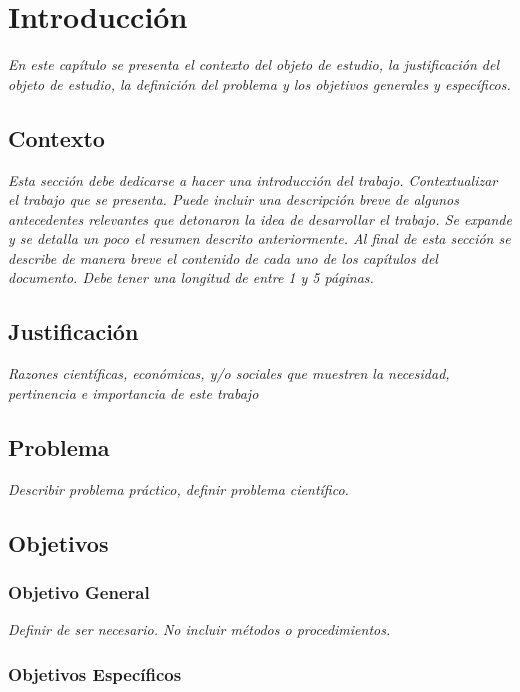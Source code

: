 \chapter{Introducción}
\label{ch:Intro}

\textit{En este capítulo se presenta el contexto del objeto de estudio, la justificación del objeto de estudio, la definición del problema y los objetivos generales y específicos.}

\newpage

\section{Contexto}

\textit{Esta sección debe dedicarse a hacer una introducción del trabajo. Contextualizar el trabajo que se presenta. Puede incluir una descripción breve de algunos antecedentes relevantes que detonaron la idea de desarrollar el trabajo. Se expande y se detalla un poco el resumen descrito anteriormente. Al final de esta sección se describe de manera breve el contenido de cada uno de los capítulos del documento. Debe tener una longitud de entre 1 y 5 páginas.}

\section{Justificación}

\textit{Razones científicas, económicas, y/o sociales que muestren la necesidad, pertinencia e importancia de este trabajo}

\section{Problema}

\textit{Describir problema práctico, definir problema científico.}

\section{Objetivos}

\subsection{Objetivo General}

\textit{Definir de ser necesario. No incluir métodos o procedimientos.}


\subsection{Objetivos Específicos}

